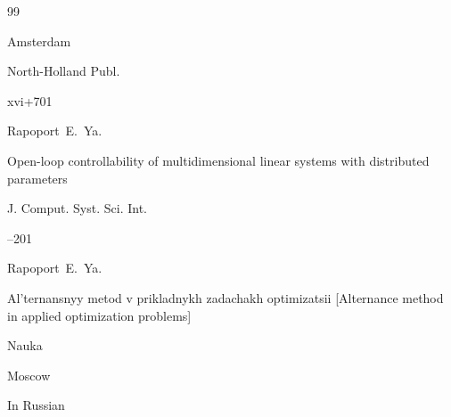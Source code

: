 \begin{thebibliography}{99}

\publaddr  Amsterdam

\publ North-Holland Publ.

\totalpages xvi+701 







\by Rapoport~E.~Ya.

\paper Open-loop controllability of multidimensional linear systems with distributed parameters

\jour J. Comput. Syst. Sci. Int.




--201





\by Rapoport~E.~Ya. 

\book Al'ternansnyy metod v prikladnykh zadachakh optimizatsii \rm [Alternance method in applied optimization problems]


\publ Nauka

\publaddr Moscow

\lang In Russian






\end{thebibliography}





%

